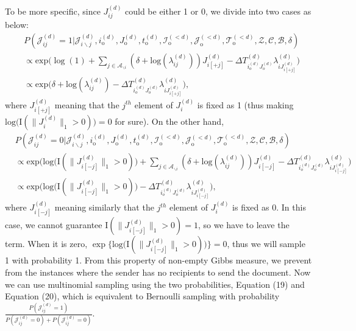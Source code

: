\documentclass[a4paper]{article}
\begin{document}
   To be more specific, since ${J}^{(d)}_{ij}$ could be either 1 or 0, we divide into two cases as below:
   \begin{equation}
   \begin{aligned}
   &P(\mathcal{J}^{(d)}_{ij}=1| \mathcal{J}^{(d)}_{i\backslash j}, i^{(d)}_{\mbox{o}}, J^{(d)}_{\mbox{o}}, t^{(d)}_{\mbox{o}}, \mathcal{I}^{(<d)}_{\mbox{o}}, \mathcal{J}^{(<d)}_{\mbox{o}}, \mathcal{T}^{(<d)}_{\mbox{o}}, \mathcal{Z}, \mathcal{C}, \mathcal{B}, \delta)\\& \propto \mbox{exp}\Big(\log(1) +\sum_{j \in \mathcal{A}_{\backslash i}} ( \delta+\mbox{log}(\lambda_{ij}^{(d)}))J_{i[+j]}^{(d)} -\Delta T^{(d)}_{i_o^{(d)}J_o^{(d)}}\lambda^{(d)}_{iJ^{(d)}_{ i[+j]}}\Big)
   \\& \propto \mbox{exp}\Big(\delta+\mbox{log}(\lambda_{ij}^{(d)})-\Delta T^{(d)}_{i_o^{(d)}J_o^{(d)}}\lambda^{(d)}_{iJ^{(d)}_{ i[+j]}}\Big),
   \end{aligned}
   \end{equation}
   where $J^{(d)}_{i[+j]}$ meaning that the $j^{th}$ element of $J_{i}^{(d)}$ is fixed as 1 (thus making $\mbox{log}\big(\text{I}(\lVert J_{i}^{(d)} \rVert_1 > 0 )\big) = 0$ for sure). On the other hand, 
   \begin{equation}
   \begin{aligned}
   &P(\mathcal{J}^{(d)}_{ij}=0| \mathcal{J}^{(d)}_{i\backslash j}, i^{(d)}_{\mbox{o}}, J^{(d)}_{\mbox{o}}, t^{(d)}_{\mbox{o}}, \mathcal{I}^{(<d)}_{\mbox{o}}, \mathcal{J}^{(<d)}_{\mbox{o}}, \mathcal{T}^{(<d)}_{\mbox{o}}, \mathcal{Z}, \mathcal{C}, \mathcal{B}, \delta)\\& \propto \mbox{exp}\Big(\mbox{log}\big(\text{I}( \lVert J_{i[-j]}^{(d)} \rVert_1> 0 )\big) + \sum_{j \in \mathcal{A}_{\backslash i}} (\delta+\mbox{log}(\lambda_{ij}^{(d)}))J_{i[-j]}^{(d)} -\Delta T^{(d)}_{i_o^{(d)}J_o^{(d)}}\lambda^{(d)}_{iJ^{(d)}_{ i[-j]}}\Big)
   \\& \propto \mbox{exp}\Big(\mbox{log}\big(\text{I}( \lVert J_{i[-j]}^{(d)} \rVert_1 > 0 )\big) -\Delta T^{(d)}_{i_o^{(d)}J_o^{(d)}}\lambda^{(d)}_{iJ^{(d)}_{ i[-j]}}\Big),
   \end{aligned}
   \end{equation}
   where $J^{(d)}_{i[-j]}$ meaning similarly that the $j^{th}$ element of $J_{i}^{(d)}$ is fixed as 0. In this case, we cannot guarantee $\text{I}( \lVert J_{i[-j]}^{(d)} \rVert_1 > 0)=1$, so we have to leave the term. When it is zero, $\exp\{\mbox{log}\big(\text{I}( \lVert J_{i[-j]}^{(d)} \rVert_1 > 0 )\big)\} = 0$, thus we will sample 1 with probability 1. From this property of non-empty Gibbs measure, we prevent from the instances where the sender has no recipients to send the document. Now we can use multinomial sampling using the two probabilities, Equation (19) and Equation (20), which is equivalent to Bernoulli sampling with probability $\frac{P(\mathcal{J}^{(d)}_{ij}=1)}{P(\mathcal{J}^{(d)}_{ij}=0)+ P(\mathcal{J}^{(d)}_{ij}=0)}$. 
\end{document}
